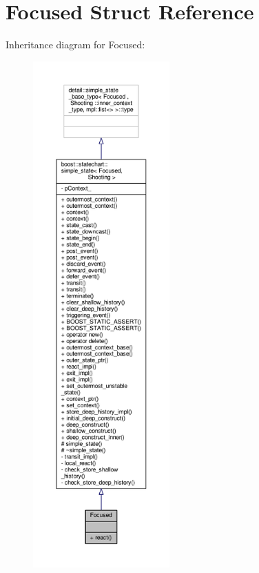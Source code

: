 \hypertarget{struct_focused}{}\section{Focused Struct Reference}
\label{struct_focused}


Inheritance diagram for Focused\+:
\nopagebreak
\begin{figure}[H]
\begin{center}
\leavevmode
\includegraphics[height=550pt]{struct_focused__inherit__graph}
\end{center}
\end{figure}


